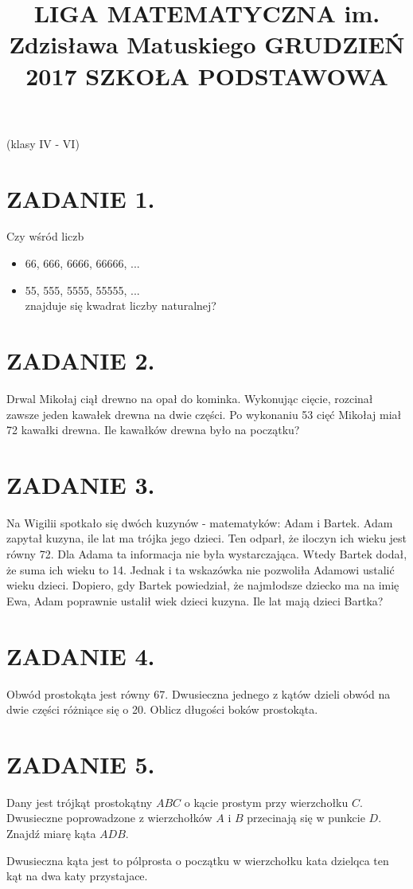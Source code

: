 \documentclass[10pt]{article}
\title{LIGA MATEMATYCZNA im. Zdzisława Matuskiego GRUDZIEŃ 2017 SZKOŁA PODSTAWOWA }
\author{}
\date{}
\begin{document}
\maketitle
(klasy IV - VI)

\section*{ZADANIE 1.}
Czy wśród liczb

\begin{itemize}
  \item 66, 666, 6666, 66666, ...
  \item 55, 555, 5555, 55555, ...\\
znajduje się kwadrat liczby naturalnej?
\end{itemize}

\section*{ZADANIE 2.}
Drwal Mikołaj ciął drewno na opał do kominka. Wykonując cięcie, rozcinał zawsze jeden kawałek drewna na dwie części. Po wykonaniu 53 cięć Mikołaj miał 72 kawałki drewna. Ile kawałków drewna było na początku?

\section*{ZADANIE 3.}
Na Wigilii spotkało się dwóch kuzynów - matematyków: Adam i Bartek. Adam zapytał kuzyna, ile lat ma trójka jego dzieci. Ten odparł, że iloczyn ich wieku jest równy 72. Dla Adama ta informacja nie była wystarczająca. Wtedy Bartek dodał, że suma ich wieku to 14. Jednak i ta wskazówka nie pozwoliła Adamowi ustalić wieku dzieci. Dopiero, gdy Bartek powiedział, że najmłodsze dziecko ma na imię Ewa, Adam poprawnie ustalił wiek dzieci kuzyna. Ile lat mają dzieci Bartka?

\section*{ZADANIE 4.}
Obwód prostokąta jest równy 67. Dwusieczna jednego z kątów dzieli obwód na dwie części różniące się o 20. Oblicz długości boków prostokąta.

\section*{ZADANIE 5.}
Dany jest trójkąt prostokątny \(A B C\) o kącie prostym przy wierzchołku \(C\). Dwusieczne poprowadzone z wierzchołków \(A\) i \(B\) przecinają się w punkcie \(D\). Znajdź miarę kąta \(A D B\).

Dwusieczna kąta jest to pólprosta o początku w wierzchołku kata dzielqca ten kąt na dwa katy przystajace.
\end{document}
